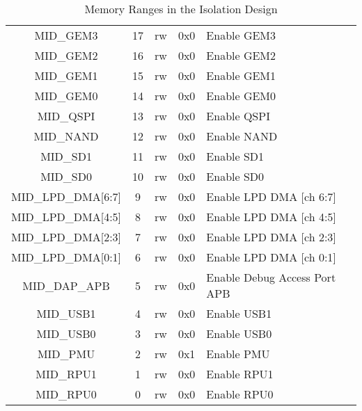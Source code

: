 \begin{table}[ht!]
\begin{tabular}{|c|c|c|c|l|}
        \\
      MID\_GEM3 & 17 & rw & 0x0 & Enable GEM3 \\
      MID\_GEM2 & 16 & rw & 0x0 & Enable GEM2 \\
      MID\_GEM1 & 15 & rw & 0x0 & Enable GEM1 \\
      MID\_GEM0 & 14 & rw & 0x0 & Enable GEM0 \\
      MID\_QSPI & 13 & rw & 0x0 & Enable QSPI \\
      MID\_NAND & 12 & rw & 0x0 & Enable NAND \\
      MID\_SD1 & 11 & rw & 0x0 & Enable SD1 \\
      MID\_SD0 & 10 & rw & 0x0 & Enable SD0 \\
      MID\_LPD\_DMA[6:7] & 9 & rw & 0x0 & Enable LPD DMA [ch 6:7] \\
      MID\_LPD\_DMA[4:5] & 8 & rw & 0x0 & Enable LPD DMA [ch 4:5] \\
      MID\_LPD\_DMA[2:3] & 7 & rw & 0x0 & Enable LPD DMA [ch 2:3] \\
      MID\_LPD\_DMA[0:1] & 6 & rw & 0x0 & Enable LPD DMA [ch 0:1] \\
      MID\_DAP\_APB & 5 & rw & 0x0 & Enable Debug Access Port APB \\
      MID\_USB1 & 4 & rw & 0x0 & Enable USB1 \\
      MID\_USB0 & 3 & rw & 0x0 & Enable USB0 \\
      MID\_PMU & 2 & rw & 0x1 & Enable PMU \\
      MID\_RPU1 & 1 & rw & 0x0 & Enable RPU1 \\
      MID\_RPU0 & 0 & rw & 0x0 & Enable RPU0 \\
      \hline
  \end{tabular}
  \caption{Memory Ranges in the Isolation Design}
  \label{table:XMPU_PL_AXI_Masters}
\end{table}


% 
% 
% 
% 
